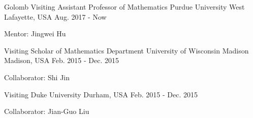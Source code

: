 

\begin{cventries}

  \cventry
    {Golomb Visiting Assistant Professor of Mathematics} %
    {Purdue University} %
    {West Lafayette, USA} %
    {Aug. 2017 - Now} %
    {
      \begin{cvitems} %
        \item {Mentor: Jingwei Hu}
      \end{cvitems}
    }

  \cventry
    {Visiting Scholar of Mathematics Department} %
    {University of Wisconsin Madison} %
    {Madison, USA} %
    {Feb. 2015 - Dec. 2015} %
    {
      \begin{cvitems} %
        \item {Collaborator: Shi Jin}
      \end{cvitems}
    }

  \cventry
    {Visiting} %
    {Duke University} %
    {Durham, USA} %
    {Feb. 2015 - Dec. 2015} %
    {
      \begin{cvitems} %
        \item {Collaborator: Jian-Guo Liu}
      \end{cvitems}
    }

\end{cventries}

